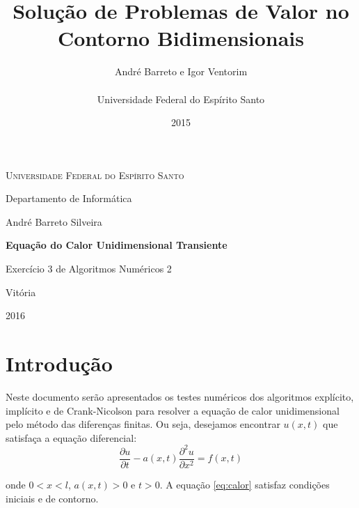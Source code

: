 \documentclass[
	11pt,				%
	oneside,			%
	a4paper,			%
	english,			%
	brazil,				%
	]{article}
\title{\textbf{Solução de Problemas de Valor no Contorno Bidimensionais}}
\author{
André Barreto e Igor Ventorim\\\\
\normalsize Universidade Federal do Espírito Santo\\
}
\date{2015}
\begin{document}


\frenchspacing

\graphicspath{ {Imagens/} }

\begin{titlepage}
	\centering
	{\scshape \large Universidade Federal do Espírito Santo\par}
	{\large Departamento de Informática\par}
	\vspace{1cm}
	{\large André Barreto Silveira\par}
	
	\vfill
	
	{\LARGE \bfseries Equação do Calor Unidimensional Transiente\par}
	\vspace{1cm}
	{\large Exercício 3 de Algoritmos Numéricos 2\par}

	\vfill

	{\large Vitória\par}
	{\large 2016\par}
\end{titlepage}
\addtocounter{page}{1}

\section{Introdução}
Neste documento serão apresentados os testes numéricos dos algoritmos 
explícito, implícito e de Crank-Nicolson para resolver a equação de calor 
unidimensional pelo método das diferenças finitas. Ou seja, desejamos encontrar 
$u(x,t)$ que satisfaça a equação diferencial:
\begin{equation} \label{eq:calor}
\frac{\partial u}{\partial t} -
a(x,t)\frac{\partial^2 u}{\partial x^2}
= f(x,t)
\end{equation}

onde $0 < x < l$, $a(x,t) > 0$ e $t > 0$. A equação \ref{eq:calor} satisfaz 
condições iniciais e de contorno.

\end{document}
